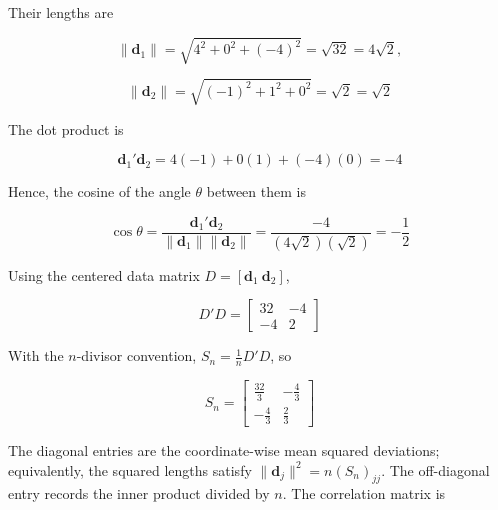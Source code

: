 \documentclass[12pt]{article}
\begin{document}
\vspace{0.2cm}

Their lengths are

\vspace{0.2cm}

\[
\|\boldsymbol{d}_1\|
=\sqrt{4^2+0^2+(-4)^2}
=\sqrt{32}
=\boxed{4\sqrt{2}},
\]

\vspace{0.2cm}

\[
\|\boldsymbol{d}_2\|
=\sqrt{(-1)^2+1^2+0^2}
=\sqrt{2}
=\boxed{\sqrt{2}}
\]

\vspace{0.2cm}

The dot product is

\vspace{0.2cm}

\[
\boldsymbol{d}_1'\boldsymbol{d}_2
=4(-1)+0(1)+(-4)(0)=-4
\]

\vspace{0.2cm}

Hence, the cosine of the angle $\theta$ between them is

\vspace{0.2cm}

\[
\cos\theta
=\frac{\boldsymbol{d}_1'\boldsymbol{d}_2}
{\|\boldsymbol{d}_1\|\|\boldsymbol{d}_2\|}
=\frac{-4}{(4\sqrt{2})(\sqrt{2})}
=\boxed{-\frac12}
\]

\vspace{0.2cm}

Using the centered data matrix $D=[\boldsymbol{d}_1\ \boldsymbol{d}_2]$,

\vspace{0.2cm}

\[
D' D=
\begin{bmatrix}
32&-4\\
-4&2
\end{bmatrix}
\]

\vspace{0.2cm}

With the $n$-divisor convention, $S_n=\frac1nD'D$, so

\vspace{0.2cm}

\[
\boxed{
S_n=\begin{bmatrix}
\frac{32}{3}&-\frac43\\
-\frac43&\frac23
\end{bmatrix}}
\]

\vspace{0.2cm}

The diagonal entries are the coordinate-wise mean squared deviations; equivalently, the squared lengths satisfy $\|\boldsymbol{d}_j\|^2=n(S_n)_{jj}$. The off-diagonal entry records the inner product divided by $n$. The correlation matrix is
\end{document}
